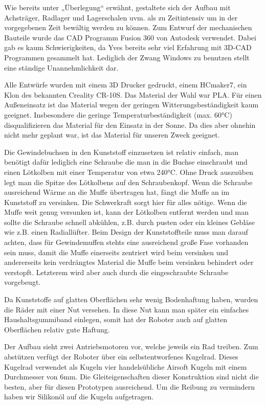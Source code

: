 \documentclass{article}
\begin{document}
Wie bereits unter „Überlegung“ erwähnt, gestaltete sich der Aufbau mit Achsträger, Radlager und Lagerschalen uvm. als zu Zeitintensiv um in der vorgegebenen Zeit bewältig werden zu können.
Zum Entwurf der mechanischen Bauteile wurde das CAD Programm Fusion 360 von Autodesk verwendet. Dabei gab es kaum Schwierigkeiten, da Yves bereits sehr viel Erfahrung mit 3D-CAD Programmen gesammelt hat. Lediglich der Zwang Windows zu benutzen stellt eine ständige Unannehmlichkeit dar.

Alle Entwürfe wurden mit einem 3D Drucker gedruckt, einem HCmaker7, ein Klon des bekannten Creality CR-10S.
Das Material der Wahl war PLA. Für einen Außeneinsatz ist das Material wegen der geringen Witterungsbeständigkeit kaum geeignet. Insbesondere die geringe Temperaturbeständigkeit (max. 60°C) disqualifizieren das Material für den Einsatz in der Sonne. Da dies aber ohnehin nicht mehr geplant war, ist das Material für unseren Zweck geeignet.

Die Gewindebuchsen in den Kunststoff einzusetzen ist relativ einfach, man benötigt dafür lediglich eine Schraube die man in die Buchse einschraubt und einen Lötkolben mit einer Temperatur von etwa 240°C. Ohne Druck auszuüben legt man die Spitze des Lötkolbens auf den Schraubenkopf. Wenn die Schraube ausreichend Wärme an die Muffe übertragen hat, fängt die Muffe an im Kunststoff zu versinken. Die Schwerkraft sorgt hier für alles nötige. Wenn die Muffe weit genug versunken ist, kann der Lötkolben entfernt werden und man sollte die Schraube schnell abkühlen, z.B. durch pusten oder ein kleines Gebläse wie z.B. einen Radiallüfter.
Beim Design der Kunststoffteile muss man darauf achten, dass für Gewindemuffen stehts eine ausreichend große Fase vorhanden sein muss, damit die Muffe einerseits zentriert wird beim versinken und andererseits kein verdrängtes Material die Muffe beim versinken behindert oder verstopft. Letzterem wird aber auch durch die eingeschraubte Schraube vorgebeugt.

Da Kunststoffe auf glatten Oberflächen sehr wenig Bodenhaftung haben, wurden die Räder mit einer Nut versehen. In diese Nut kann man später ein einfaches Haushaltsgummiband einlegen, somit hat der Roboter auch auf glatten Oberflächen relativ gute Haftung.

Der Aufbau sieht zwei Antriebsmotoren vor, welche jeweils ein Rad treiben. Zum abstützen verfügt der Roboter über ein selbstentworfenes Kugelrad. Dieses Kugelrad verwendet als Kugeln vier handelsübliche Airsoft Kugeln mit einem Durchmesser von 6mm.
Die Gleiteigenschaften dieser Konstruktion sind nicht die besten, aber für diesen Prototypen ausreichend. Um die Reibung zu vermindern haben wir Silikonöl auf die Kugeln aufgetragen.
\end{document}
